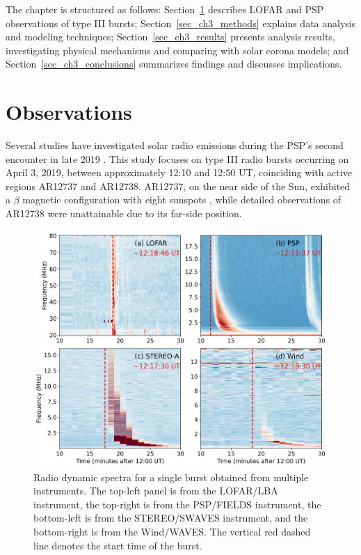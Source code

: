 The chapter is structured as follows: Section~\ref{sec_ch3_obs} describes LOFAR and PSP observations of type III bursts; Section~\ref{sec_ch3_methods} explains data analysis and modeling techniques; Section~\ref{sec_ch3_results} presents analysis results, investigating physical mechanisms and comparing with solar corona models; and Section~\ref{sec_ch3_conclusions} summarizes findings and discusses implications.

\section{Observations}
\label{sec_ch3_obs}
Several studies have investigated solar radio emissions during the PSP's second encounter in late 2019 \cite{krupar_2020, pulupa_2020, cattell_2021, harra_2021, badman_2022}. This study focuses on type III radio bursts occurring on April 3, 2019, between approximately 12:10 and 12:50 UT, coinciding with active regions AR12737 and AR12738. AR12737, on the near side of the Sun, exhibited a $\beta$ magnetic configuration with eight sunspots \cite{hale_2019}, while detailed observations of AR12738 were unattainable due to its far-side position.

\begin{figure}
\centering
\includegraphics[width=0.7\hsize]{chapter3/figs/all_dyspec.png}
\caption{Radio dynamic spectra for a single burst obtained from multiple instruments. The top-left panel is from the LOFAR/LBA instrument, the top-right is from the PSP/FIELDS instrument, the bottom-left is from the STEREO/SWAVES instrument, and the bottom-right is from the Wind/WAVES. The vertical red dashed line denotes the start time of the burst.}
\label{fig_alldyspec}
\end{figure}

